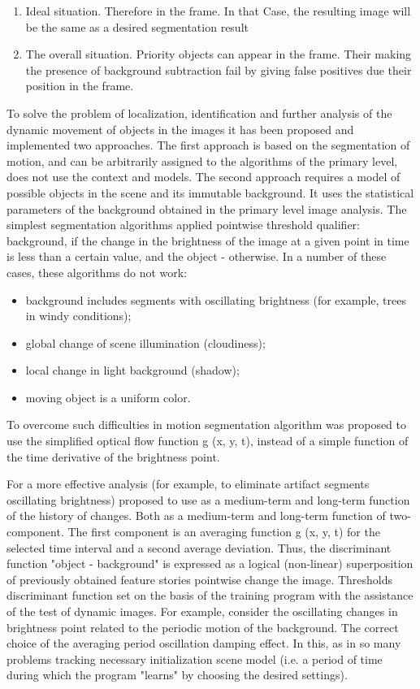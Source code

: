\begin{enumerate}
    \item Ideal situation. Therefore in the frame. In that Case, the resulting image will be the same as a desired segmentation result
    \item The overall situation. Priority objects can appear in the frame. Their making the presence of background subtraction fail by giving false positives due their position in the frame. \cite{Cheung}
\end{enumerate}


To solve the problem of localization, identification and further analysis of the dynamic movement of objects in the images it has been proposed and implemented two approaches. The first approach is based on the segmentation of motion, and can be arbitrarily assigned to the algorithms of the primary level, does not use the context and models. The second approach requires a model of possible objects in the scene and its immutable background. It uses the statistical parameters of the background obtained in the primary level image analysis.
The simplest segmentation algorithms applied pointwise threshold qualifier: background, if the change in the brightness of the image at a given point in time is less than a certain value, and the object - otherwise.
In a number of these cases, these algorithms do not work: 
\begin{itemize}
    \item background includes segments with oscillating brightness (for example, trees in windy conditions);
    \item global change of scene illumination (cloudiness);
    \item local change in light background (shadow);
    \item moving object is a uniform color.
\end{itemize}

To overcome such difficulties in motion segmentation algorithm was proposed to use the simplified optical flow function g (x, y, t), instead of a simple function of the time derivative of the brightness point.

For a more effective analysis (for example, to eliminate artifact segments oscillating brightness) proposed to use as a medium-term and long-term function of the history of changes. Both as a medium-term and long-term function of two-component. The first component is an averaging function g (x, y, t) for the selected time interval and a second average deviation. Thus, the discriminant function "object - background" is expressed as a logical (non-linear) superposition of previously obtained feature stories pointwise change the image.
Thresholds discriminant function set on the basis of the training program with the assistance of the test of dynamic images. For example, consider the oscillating changes in brightness point related to the periodic motion of the background. The correct choice of the averaging period oscillation damping effect. In this, as in so many problems tracking necessary initialization scene model (i.e. a period of time during which the program "learns" by choosing the desired settings).

